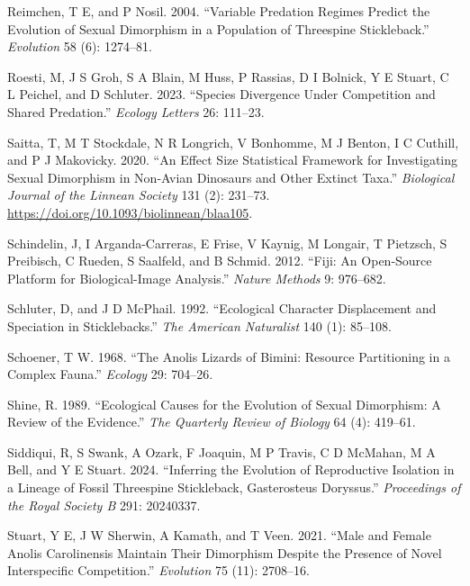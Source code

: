 \documentclass[
  12pt,
]{article}
\newlength{\cslhangindent}
\newlength{\cslentryspacingunit} %
\newenvironment{CSLReferences}[2] %
 {%
  \setlength{\parindent}{0pt}
  \ifodd #1
  \let\oldpar\par
  \def\par{\hangindent=\cslhangindent\oldpar}
  \fi
  \setlength{\parskip}{#2\cslentryspacingunit}
 }%
 {}
\begin{document}
\begin{CSLReferences}{1}{0}
\leavevmode{}%
Reimchen, T E, and P Nosil. 2004. {``Variable Predation Regimes Predict
the Evolution of Sexual Dimorphism in a Population of Threespine
Stickleback.''} \emph{Evolution} 58 (6): 1274--81.

\leavevmode{}%
Roesti, M, J S Groh, S A Blain, M Huss, P Rassias, D I Bolnick, Y E
Stuart, C L Peichel, and D Schluter. 2023. {``Species Divergence Under
Competition and Shared Predation.''} \emph{Ecology Letters} 26: 111--23.

\leavevmode{}%
Saitta, T, M T Stockdale, N R Longrich, V Bonhomme, M J Benton, I C
Cuthill, and P J Makovicky. 2020. {``An Effect Size Statistical
Framework for Investigating Sexual Dimorphism in Non-Avian Dinosaurs and
Other Extinct Taxa.''} \emph{Biological Journal of the Linnean Society}
131 (2): 231--73. \url{https://doi.org/10.1093/biolinnean/blaa105}.

\leavevmode{}%
Schindelin, J, I Arganda-Carreras, E Frise, V Kaynig, M Longair, T
Pietzsch, S Preibisch, C Rueden, S Saalfeld, and B Schmid. 2012.
{``Fiji: An Open-Source Platform for Biological-Image Analysis.''}
\emph{Nature Methods} 9: 976--682.

\leavevmode{}%
Schluter, D, and J D McPhail. 1992. {``Ecological Character Displacement
and Speciation in Sticklebacks.''} \emph{The American Naturalist} 140
(1): 85--108.

\leavevmode{}%
Schoener, T W. 1968. {``The Anolis Lizards of Bimini: Resource
Partitioning in a Complex Fauna.''} \emph{Ecology} 29: 704--26.

\leavevmode{}%
Shine, R. 1989. {``Ecological Causes for the Evolution of Sexual
Dimorphism: A Review of the Evidence.''} \emph{The Quarterly Review of
Biology} 64 (4): 419--61.

\leavevmode{}%
Siddiqui, R, S Swank, A Ozark, F Joaquin, M P Travis, C D McMahan, M A
Bell, and Y E Stuart. 2024. {``Inferring the Evolution of Reproductive
Isolation in a Lineage of Fossil Threespine Stickleback, Gasterosteus
Doryssus.''} \emph{Proceedings of the Royal Society B} 291: 20240337.

\leavevmode{}%
Stuart, Y E, J W Sherwin, A Kamath, and T Veen. 2021. {``Male and Female
Anolis Carolinensis Maintain Their Dimorphism Despite the Presence of
Novel Interspecific Competition.''} \emph{Evolution} 75 (11): 2708--16.


\end{CSLReferences}
\end{document}
